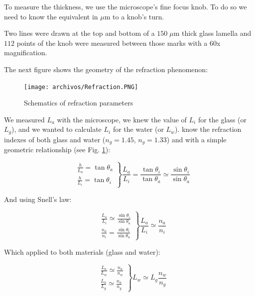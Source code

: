 To measure the thickness, we use the microscope's fine focus knob. To do so we need to know the equivalent in $\mu \textrm{m}$ to a knob's turn. 

Two lines were drawn at the top and bottom of a $150 \; \mu \textrm{m}$ thick glass lamella and $112$ points of the knob were measured between those marks with a 60x magnification. 

The next figure shows the geometry of the refraction phenomenon:

\begin{figure}[H]
	\centering
	\texttt{[image: archivos/Refraction.PNG]}
	\caption{Schematics of refraction parameters}
	\label{refraction}
\end{figure}

We measured $L_a$ with the microscope, we knew the value of $L_i$ for the glass (or $L_g$), and we wanted to calculate $L_i$ for the water (or $L_w$). know the refraction indexes of both glass and water ($n_g = 1.45$,  $n_g = 1.33$) and with a simple geometric relationship (see Fig. \ref{refraction}):

\begin{equation}
\left.
\begin{aligned}
& \frac{h}{L_a} = \tan \theta_a \\
& \frac{h}{L_i} = \tan \theta_i
\end{aligned}
\right\}
\frac{L_a}{L_i} = \frac{\tan \theta_i}{\tan \theta_a} \simeq \frac{\sin \theta_i}{\sin \theta_a}
\end{equation}

And using Snell's law:

\begin{equation}
\left.
\begin{aligned}
& \frac{L_a}{L_i} \simeq \frac{\sin \theta_i}{\sin \theta_a} \\
& \frac{n_a}{n_i} = \frac{\sin \theta_i}{\sin \theta_a}
\end{aligned}
\right\}
\frac{L_a}{L_i} \simeq \frac{n_a}{n_i} 
\end{equation}

Which applied to both materials (glass and water):

\begin{equation}
\left.
\begin{aligned}
& \frac{L_a}{L_w} \simeq \frac{n_a}{n_w} \\
& \frac{L_a}{L_g} \simeq \frac{n_a}{n_g} 
\end{aligned}
\right\}
L_w \simeq L_g\frac{n_w}{n_g} 
\end{equation}


